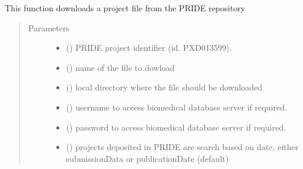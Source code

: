 \documentclass[letterpaper,10pt,english]{sphinxmanual}
\begin{document}
\begin{fulllineitems}
\label{\detokenize{_autosummary/graphdb_builder:graphdb_builder.builder_utils.download_PRIDE_data}}
This function downloads a project file from the PRIDE repository
\begin{quote}\begin{description}
\item[{Parameters}] \leavevmode\begin{itemize}
\item {} 
 () \textendash{} PRIDE project identifier (id. PXD013599).

\item {} 
 () \textendash{} name of the file to dowload

\item {} 
 () \textendash{} local directory where the file should be downloaded

\item {} 
 () \textendash{} username to access biomedical database server if required.

\item {} 
 () \textendash{} password to access biomedical database server if required.

\item {} 
 () \textendash{} projects deposited in PRIDE are search based on date, either 
submissionData or publicationDate (default)

\end{itemize}

\end{description}\end{quote}

\end{fulllineitems}
\end{document}
